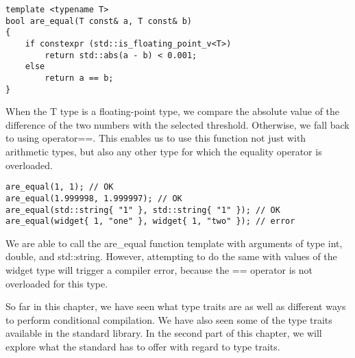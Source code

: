 \begin{lstlisting}[style=styleCXX]
template <typename T>
bool are_equal(T const& a, T const& b)
{
	if constexpr (std::is_floating_point_v<T>)
		return std::abs(a - b) < 0.001;
	else
		return a == b;
}
\end{lstlisting}

When the T type is a floating-point type, we compare the absolute value of the difference of the two numbers with the selected threshold. Otherwise, we fall back to using operator==. This enables us to use this function not just with arithmetic types, but also any other type for which the equality operator is overloaded.

\begin{lstlisting}[style=styleCXX]
are_equal(1, 1); // OK
are_equal(1.999998, 1.999997); // OK
are_equal(std::string{ "1" }, std::string{ "1" }); // OK
are_equal(widget{ 1, "one" }, widget{ 1, "two" }); // error
\end{lstlisting}

We are able to call the are\_equal function template with arguments of type int, double, and std::string. However, attempting to do the same with values of the widget type will trigger a compiler error, because the == operator is not overloaded for this type.

So far in this chapter, we have seen what type traits are as well as different ways to perform conditional compilation. We have also seen some of the type traits available in the standard library. In the second part of this chapter, we will explore what the standard has to offer with regard to type traits.






































